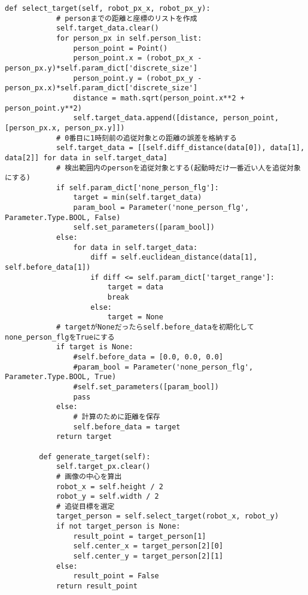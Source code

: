 \begin{lstlisting}[caption=person\_detector.py, label=person]
        def select_target(self, robot_px_x, robot_px_y):
            # personまでの距離と座標のリストを作成
            self.target_data.clear()
            for person_px in self.person_list:
                person_point = Point()
                person_point.x = (robot_px_x - person_px.y)*self.param_dict['discrete_size']
                person_point.y = (robot_px_y - person_px.x)*self.param_dict['discrete_size']
                distance = math.sqrt(person_point.x**2 + person_point.y**2)
                self.target_data.append([distance, person_point, [person_px.x, person_px.y]])
            # 0番目に1時刻前の追従対象との距離の誤差を格納する
            self.target_data = [[self.diff_distance(data[0]), data[1], data[2]] for data in self.target_data]
            # 検出範囲内のpersonを追従対象とする(起動時だけ一番近い人を追従対象にする)
            if self.param_dict['none_person_flg']:
                target = min(self.target_data)
                param_bool = Parameter('none_person_flg', Parameter.Type.BOOL, False)
                self.set_parameters([param_bool])
            else:
                for data in self.target_data:
                    diff = self.euclidean_distance(data[1], self.before_data[1])
                    if diff <= self.param_dict['target_range']:
                        target = data
                        break
                    else:
                        target = None
            # targetがNoneだったらself.before_dataを初期化してnone_person_flgをTrueにする
            if target is None:
                #self.before_data = [0.0, 0.0, 0.0]
                #param_bool = Parameter('none_person_flg', Parameter.Type.BOOL, True)
                #self.set_parameters([param_bool])
                pass
            else:
                # 計算のために距離を保存
                self.before_data = target
            return target
    
        def generate_target(self):
            self.target_px.clear()
            # 画像の中心を算出
            robot_x = self.height / 2
            robot_y = self.width / 2
            # 追従目標を選定
            target_person = self.select_target(robot_x, robot_y)
            if not target_person is None:
                result_point = target_person[1]
                self.center_x = target_person[2][0]
                self.center_y = target_person[2][1]
            else:
                result_point = False
            return result_point
    

\end{lstlisting}
